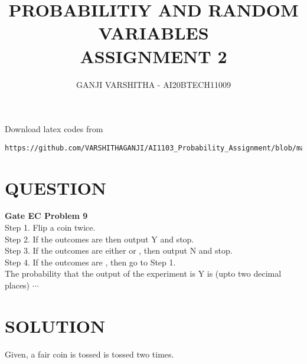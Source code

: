 \documentclass[journal,12pt,twocolumn]{IEEEtran}
\begin{document}
\let\vec\mathbf
\renewcommand{\thefigure}{\theproblem}
\def\putbox#1#2#3{\makebox[0in][l]{\makebox[#1][l]{}\raisebox{\baselineskip}[0in][0in]{\raisebox{#2}[0in][0in]{#3}}}}
     \def\rightbox#1{\makebox[0in][r]{#1}}
     \def\centbox#1{\makebox[0in]{#1}}
     \def\topbox#1{\raisebox{-\baselineskip}[0in][0in]{#1}}
     \def\midbox#1{\raisebox{-0.5\baselineskip}[0in][0in]{#1}}
\vspace{3cm}
\title{\textbf{PROBABILITIY AND RANDOM VARIABLES\\ASSIGNMENT 2}}
\author{GANJI VARSHITHA - AI20BTECH11009}
\maketitle
\newpage
\bigskip
\renewcommand{\thefigure}{\arabic{figure}}
\renewcommand{\thetable}{\arabic{table}}
Download latex codes from 
%
\begin{lstlisting}
https://github.com/VARSHITHAGANJI/AI1103_Probability_Assignment/blob/main/Assignment2.tex
\end{lstlisting}
\section*{QUESTION}
\textbf{Gate EC Problem 9 }
\\
Step 1. Flip a coin twice.\\
Step 2. If the outcomes are 
then output Y and stop.\\
Step 3. If the outcomes are either  or , then output N
and stop.\\
Step 4. If the outcomes are ,
then go to Step 1.\\
The probability that the output of the experiment is Y is (upto two decimal places) $\cdots$
\section*{SOLUTION}
Given, a fair coin is tossed is tossed two times.
\end{document}
